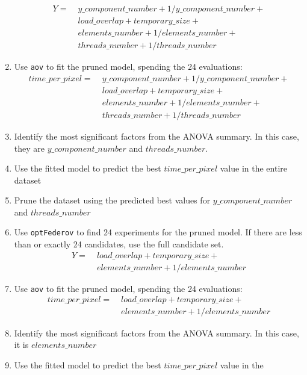 \documentclass[final,12pt,a4paper]{article}
\begin{document}
\begin{enumerate}
\begin{align*}
    Y = & \; y\_component\_number + 1 / y\_component\_number + \\
        & \; load\_overlap + temporary\_size + \\
        & \; elements\_number + 1 / elements\_number + \\
        & \; threads\_number + 1 / threads\_number
\end{align*}
\item Use \texttt{aov} to fit the pruned model, spending the 24 evaluations:
\begin{align*}
      time\_per\_pixel = & \; y\_component\_number + 1 / y\_component\_number + \\
                        & \; load\_overlap + temporary\_size + \\
                        & \; elements\_number + 1 / elements\_number + \\
                        & \; threads\_number + 1 / threads\_number
\end{align*}
\item Identify the most significant factors from the ANOVA summary. In this
case, they are \(y\_component\_number\) and \(threads\_number\).
\item Use the fitted model to predict the best \(time\_per\_pixel\) value in the
entire dataset
\item Prune the dataset using the predicted best values for \(y\_component\_number\) and
\(threads\_number\)
\item Use \texttt{optFederov} to find 24 experiments for the pruned model. If there are less
than or exactly 24 candidates, use the full candidate set.
\begin{align*}
    Y = & \; load\_overlap + temporary\_size + \\
        & \; elements\_number + 1 / elements\_number
\end{align*}
\item Use \texttt{aov} to fit the pruned model, spending the 24 evaluations:
\begin{align*}
      time\_per\_pixel = & \; load\_overlap + temporary\_size + \\
                        & \; elements\_number + 1 / elements\_number
\end{align*}
\item Identify the most significant factors from the ANOVA summary. In this
case, it is \(elements\_number\)
\item Use the fitted model to predict the best \(time\_per\_pixel\) value in the

\end{enumerate}
\end{document}
